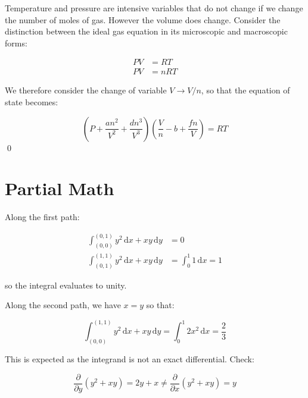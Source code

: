 \documentclass[12pt]{article}
\begin{document}
Temperature and pressure are intensive variables that do not change if we change the number of moles of gas. However the volume does change. Consider the distinction between the ideal gas equation in its microscopic and macroscopic forms:

\begin{equation}
\begin{split}
    PV &= RT \\
    PV &= nRT
\end{split}
\end{equation}

We therefore consider the change of variable $V \to V/n$, so that the equation of state becomes:

\begin{equation}
    \left( P + \frac{an^{2}}{V^{2}} + \frac{dn^{3}}{V^{3}} \right) \left( \frac{V}{n} - b + \frac{fn}{V} \right) = RT
\end{equation}
\qed


\pagebreak
\section*{Partial Math}



Along the first path:

\begin{equation}
\begin{split}
    \int_{(0, 0)}^{(0, 1)} y^{2} \, \mathrm{d}x + xy \, \mathrm{d}y &= 0 \\
    \int_{(0, 1)}^{(1, 1)} y^{2} \, \mathrm{d}x + xy \, \mathrm{d}y &= \int_{0}^{1} 1 \, \mathrm{d}x = 1
\end{split}
\end{equation}

so the integral evaluates to unity.

Along the second path, we have $x = y$ so that:

\begin{equation}
    \int_{(0, 0)}^{(1, 1)} y^{2} \, \mathrm{d}x + xy \, \mathrm{d}y = \int_{0}^{1} 2x^{2} \, \mathrm{d}x = \frac{2}{3}
\end{equation}

This is expected as the integrand is not an exact differential. Check:

\begin{equation}
    \frac{\partial}{\partial y} (y^{2} + xy) = 2y + x \neq \frac{\partial}{\partial x} (y^{2} + xy) = y
\end{equation}
\end{document}
